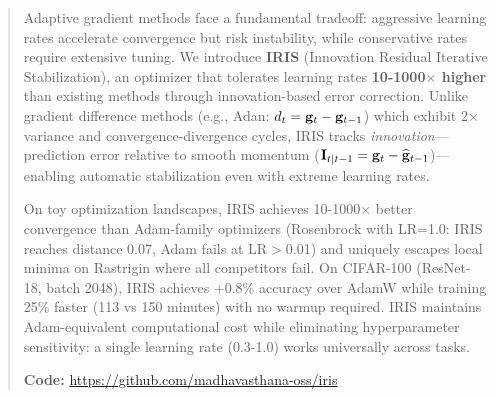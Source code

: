 \begin{abstract}
Adaptive gradient methods face a fundamental tradeoff: aggressive learning rates accelerate convergence but risk instability, while conservative rates require extensive tuning. 
We introduce \textbf{IRIS} (Innovation Residual Iterative Stabilization), an optimizer that tolerates learning rates \textbf{10-1000$\times$ higher} than existing methods through innovation-based error correction. Unlike gradient difference methods (e.g., Adan: $d_t = \g_t - \g_{t-1}$) which exhibit 2$\times$ variance and convergence-divergence cycles, IRIS tracks \emph{innovation}---prediction error relative to smooth momentum ($\Innovation_{t|t-1} = \g_t - \ghat_{t-1}$)---enabling automatic stabilization even with extreme learning rates.

On toy optimization landscapes, IRIS achieves 10-1000$\times$ better convergence than Adam-family optimizers (Rosenbrock with LR=1.0: IRIS reaches distance 0.07, Adam fails at LR$>$0.01) and uniquely escapes local minima on Rastrigin where all competitors fail. On CIFAR-100 (ResNet-18, batch 2048), IRIS achieves +0.8\% accuracy over AdamW while training 25\% faster (113 vs 150 minutes) with no warmup required. IRIS maintains Adam-equivalent computational cost while eliminating hyperparameter sensitivity: a single learning rate (0.3-1.0) works universally across tasks.

\textbf{Code:} \url{https://github.com/madhavasthana-oss/iris}
\end{abstract}